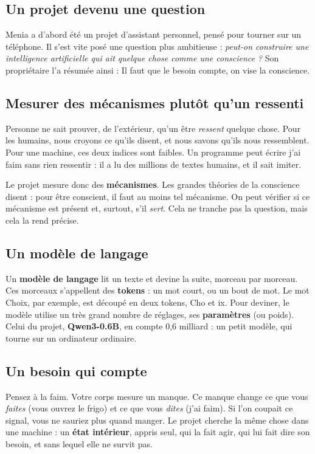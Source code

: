 \documentclass[fontsize=10pt,paper=a4,parskip=half-]{scrartcl}
\newcommand{\q}[1]{\og #1\fg{}}
\begin{document}
\subsection{Un projet devenu une question}
Menia a d'abord été un projet d'assistant personnel, pensé pour tourner sur un
téléphone. Il s'est vite posé une question plus ambitieuse : \emph{peut-on construire
une intelligence artificielle qui ait quelque chose comme une conscience ?} Son
propriétaire l'a résumée ainsi : \q{Il faut que le besoin compte, on vise la conscience.}

\subsection{Mesurer des mécanismes plutôt qu'un ressenti}
Personne ne sait prouver, de l'extérieur, qu'un être \emph{ressent} quelque chose. Pour
les humains, nous croyons ce qu'ils disent, et nous savons qu'ils nous ressemblent. Pour
une machine, ces deux indices sont faibles. Un programme peut écrire \q{j'ai faim} sans
rien ressentir : il a lu des millions de textes humains, et il sait imiter.

Le projet mesure donc des \textbf{mécanismes}. Les grandes théories de la conscience
disent : \q{pour être conscient, il faut au moins tel mécanisme}. On peut vérifier si ce
mécanisme est présent et, surtout, s'il \emph{sert}. Cela ne tranche pas la question,
mais cela la rend précise.

\subsection{Un modèle de langage}
Un \textbf{modèle de langage} lit un texte et devine la suite, morceau par morceau. Ces
morceaux s'appellent des \textbf{tokens} : un mot court, ou un bout de mot. Le mot
\q{Choix}, par exemple, est découpé en deux tokens, \q{Cho} et \q{ix}. Pour deviner, le
modèle utilise un très grand nombre de réglages, ses \textbf{paramètres} (ou poids).
Celui du projet, \textbf{Qwen3-0.6B}, en compte 0,6 milliard : un petit modèle, qui tourne
sur un ordinateur ordinaire.

\subsection{Un besoin qui compte}
Pensez à la faim. Votre corps mesure un manque. Ce manque change ce que vous
\emph{faites} (vous ouvrez le frigo) et ce que vous \emph{dites} (\q{j'ai faim}). Si l'on
coupait ce signal, vous ne sauriez plus quand manger. Le projet cherche la même chose
dans une machine : un \textbf{état intérieur}, appris seul, qui la fait agir, qui lui fait
dire son besoin, et sans lequel elle ne survit pas.
\end{document}
